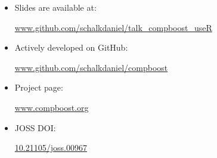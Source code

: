 \documentclass[10pt]{beamer}\usepackage[]{graphicx}\usepackage[]{color}
\begin{document}
\begin{frame}

\begin{itemize}

  \item
    Slides are available at:
    \vspace{0.2cm}
    \begin{center}
      \url{www.github.com/schalkdaniel/talk_compboost_useR}
    \end{center}
    \vspace{0.3cm}

  \item
    Actively developed on GitHub:
    \vspace{0.2cm}
    \begin{center}
      \url{www.github.com/schalkdaniel/compboost}
    \end{center}
    \vspace{0.3cm}

  \item
    Project page:
    \vspace{0.2cm}
    \begin{center}
      \url{www.compboost.org}
    \end{center}
    \vspace{0.3cm}

  \item
    JOSS DOI:
    \vspace{0.2cm}
    \begin{center}
      \href{https://joss.theoj.org/papers/94cfdbbfdfc8796c5bdb1a74ee59fcda}{\textcolor{metropolis_orange}{10.21105/joss.00967}}
    \end{center}

\end{itemize}

\end{frame}
\end{document}
